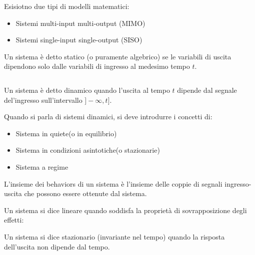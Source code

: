 Esisiotno due tipi di modelli matematici:
\begin{itemize}
  \item Sistemi multi-input multi-output (MIMO)
  \item Sistemi single-input single-output (SISO)
\end{itemize}


\begin{theorem}

  Un sistema è detto statico (o puramente algebrico) se le variabili di uscita dipendono solo dalle variabili di ingresso al medesimo tempo $t$.

  \begin{equation}
    [\exists f : \Re \rightarrow \Re \ni y(t) = f(u(t)) \quad \forall t \in \Re]
  \end{equation}
\end{theorem}

\begin{theorem}
  Un sistema è detto dinamico quando l'uscita al tempo $t$ dipende dal segnale del'ingresso sull'intervallo $]-\infty, t]$.


\end{theorem}

Quando si parla di sistemi dinamici, si deve introdurre i concetti di:
\begin{itemize}
  \item Sistema in quiete(o in equilibrio)
  \item Sistema in condizioni asintotiche(o stazionarie)
  \item Sistema a regime
\end{itemize}

\begin{theorem}
  L'insieme dei behaviors di un sistema è l'insieme delle coppie di segnali ingresso-uscita che possono essere ottenute dal sistema.
\end{theorem}

\begin{theorem}[Linearit\`a]
  Un sistema si dice lineare quando soddisfa la propriet\`a di sovrapposizione degli effetti:
\end{theorem}

\begin{theorem}[Stazionariet\`a]
  Un sistema si dice stazionario (invariante nel tempo) quando la risposta dell'uscita non dipende dal tempo.
\end{theorem}

